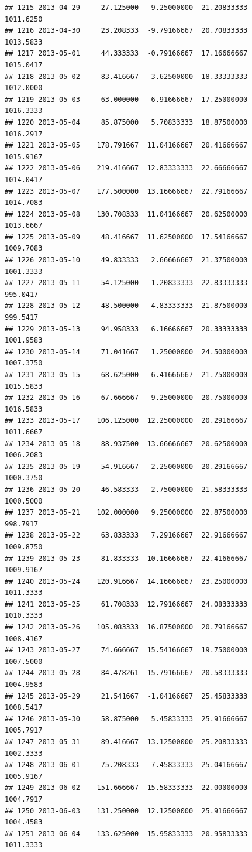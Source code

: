\documentclass[
]{article}
\begin{document}
\begin{verbatim}
## 1215 2013-04-29     27.125000  -9.25000000  21.20833333    1011.6250
## 1216 2013-04-30     23.208333  -9.79166667  20.70833333    1013.5833
## 1217 2013-05-01     44.333333  -0.79166667  17.16666667    1015.0417
## 1218 2013-05-02     83.416667   3.62500000  18.33333333    1012.0000
## 1219 2013-05-03     63.000000   6.91666667  17.25000000    1016.3333
## 1220 2013-05-04     85.875000   5.70833333  18.87500000    1016.2917
## 1221 2013-05-05    178.791667  11.04166667  20.41666667    1015.9167
## 1222 2013-05-06    219.416667  12.83333333  22.66666667    1014.0417
## 1223 2013-05-07    177.500000  13.16666667  22.79166667    1014.7083
## 1224 2013-05-08    130.708333  11.04166667  20.62500000    1013.6667
## 1225 2013-05-09     48.416667  11.62500000  17.54166667    1009.7083
## 1226 2013-05-10     49.833333   2.66666667  21.37500000    1001.3333
## 1227 2013-05-11     54.125000  -1.20833333  22.83333333     995.0417
## 1228 2013-05-12     48.500000  -4.83333333  21.87500000     999.5417
## 1229 2013-05-13     94.958333   6.16666667  20.33333333    1001.9583
## 1230 2013-05-14     71.041667   1.25000000  24.50000000    1007.3750
## 1231 2013-05-15     68.625000   6.41666667  21.75000000    1015.5833
## 1232 2013-05-16     67.666667   9.25000000  20.75000000    1016.5833
## 1233 2013-05-17    106.125000  12.25000000  20.29166667    1011.6667
## 1234 2013-05-18     88.937500  13.66666667  20.62500000    1006.2083
## 1235 2013-05-19     54.916667   2.25000000  20.29166667    1000.3750
## 1236 2013-05-20     46.583333  -2.75000000  21.58333333    1000.5000
## 1237 2013-05-21    102.000000   9.25000000  22.87500000     998.7917
## 1238 2013-05-22     63.833333   7.29166667  22.91666667    1009.8750
## 1239 2013-05-23     81.833333  10.16666667  22.41666667    1009.9167
## 1240 2013-05-24    120.916667  14.16666667  23.25000000    1011.3333
## 1241 2013-05-25     61.708333  12.79166667  24.08333333    1010.3333
## 1242 2013-05-26    105.083333  16.87500000  20.79166667    1008.4167
## 1243 2013-05-27     74.666667  15.54166667  19.75000000    1007.5000
## 1244 2013-05-28     84.478261  15.79166667  20.58333333    1004.9583
## 1245 2013-05-29     21.541667  -1.04166667  25.45833333    1008.5417
## 1246 2013-05-30     58.875000   5.45833333  25.91666667    1005.7917
## 1247 2013-05-31     89.416667  13.12500000  25.20833333    1002.3333
## 1248 2013-06-01     75.208333   7.45833333  25.04166667    1005.9167
## 1249 2013-06-02    151.666667  15.58333333  22.00000000    1004.7917
## 1250 2013-06-03    131.250000  12.12500000  25.91666667    1004.4583
## 1251 2013-06-04    133.625000  15.95833333  20.95833333    1011.3333

\end{verbatim}
\end{document}
